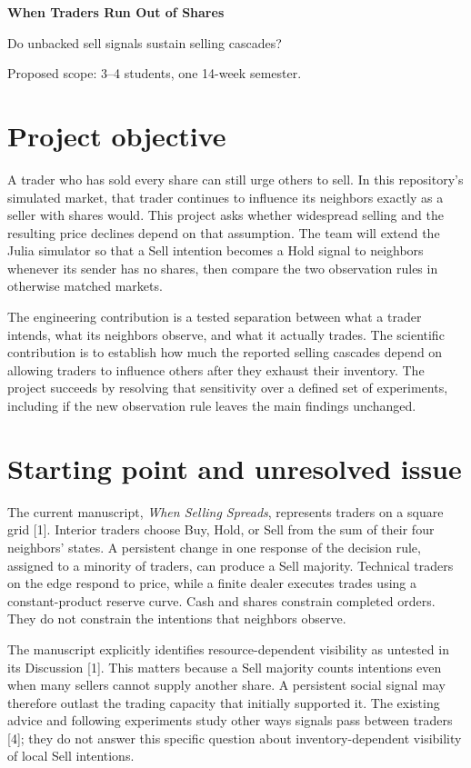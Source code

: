 \documentclass[11pt,letterpaper]{article}
\begin{document}
{\sffamily\fontsize{27}{31}\selectfont\bfseries\color{ink}When Traders Run Out of Shares\par}
\vspace{3pt}
{\sffamily\large\color{accent}Do unbacked sell signals sustain selling cascades?\par}
\vspace{8pt}
{\sffamily\small Proposed scope: 3--4 students, one 14-week semester.\par}

\section{Project objective}
A trader who has sold every share can still urge others to sell. In this repository's simulated market, that trader continues to influence its neighbors exactly as a seller with shares would. This project asks whether widespread selling and the resulting price declines depend on that assumption. The team will extend the Julia simulator so that a Sell intention becomes a Hold signal to neighbors whenever its sender has no shares, then compare the two observation rules in otherwise matched markets.

The engineering contribution is a tested separation between what a trader intends, what its neighbors observe, and what it actually trades. The scientific contribution is to establish how much the reported selling cascades depend on allowing traders to influence others after they exhaust their inventory. The project succeeds by resolving that sensitivity over a defined set of experiments, including if the new observation rule leaves the main findings unchanged.

\section{Starting point and unresolved issue}
The current manuscript, \emph{When Selling Spreads}, represents traders on a square grid [1]. Interior traders choose Buy, Hold, or Sell from the sum of their four neighbors' states. A persistent change in one response of the decision rule, assigned to a minority of traders, can produce a Sell majority. Technical traders on the edge respond to price, while a finite dealer executes trades using a constant-product reserve curve. Cash and shares constrain completed orders. They do not constrain the intentions that neighbors observe.

The manuscript explicitly identifies resource-dependent visibility as untested in its Discussion [1]. This matters because a Sell majority counts intentions even when many sellers cannot supply another share. A persistent social signal may therefore outlast the trading capacity that initially supported it. The existing advice and following experiments study other ways signals pass between traders [4]; they do not answer this specific question about inventory-dependent visibility of local Sell intentions.
\end{document}
